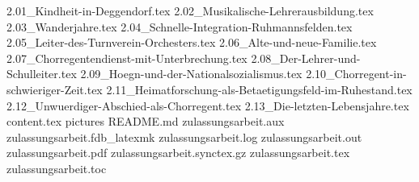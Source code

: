 2.01_Kindheit-in-Deggendorf.tex
2.02_Musikalische-Lehrerausbildung.tex
2.03_Wanderjahre.tex
2.04_Schnelle-Integration-Ruhmannsfelden.tex
2.05_Leiter-des-Turnverein-Orchesters.tex
2.06_Alte-und-neue-Familie.tex
2.07_Chorregentendienst-mit-Unterbrechung.tex
2.08_Der-Lehrer-und-Schulleiter.tex
2.09_Hoegn-und-der-Nationalsozialismus.tex
2.10_Chorregent-in-schwieriger-Zeit.tex
2.11_Heimatforschung-als-Betaetigungsfeld-im-Ruhestand.tex
2.12_Unwuerdiger-Abschied-als-Chorregent.tex
2.13_Die-letzten-Lebensjahre.tex
content.tex
pictures
README.md
zulassungsarbeit.aux
zulassungsarbeit.fdb_latexmk
zulassungsarbeit.log
zulassungsarbeit.out
zulassungsarbeit.pdf
zulassungsarbeit.synctex.gz
zulassungsarbeit.tex
zulassungsarbeit.toc
